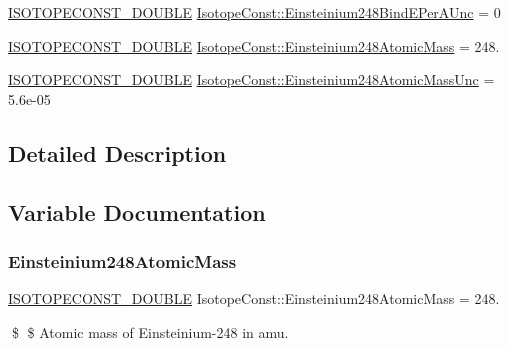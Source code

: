 \begin{DoxyCompactItemize}
\mbox{\hyperlink{group___isotope_const-_macros_ga8f45a7272ce02c0b4c65c44636ed719a}{I\+S\+O\+T\+O\+P\+E\+C\+O\+N\+S\+T\+\_\+\+D\+O\+U\+B\+LE}} \mbox{\hyperlink{group___isotope_const-_einsteinium-_es248_ga39caf7e4ff579f03495d7c194542b9e2}{Isotope\+Const\+::\+Einsteinium248\+Bind\+E\+Per\+A\+Unc}} = 0
\item 
\mbox{\hyperlink{group___isotope_const-_macros_ga8f45a7272ce02c0b4c65c44636ed719a}{I\+S\+O\+T\+O\+P\+E\+C\+O\+N\+S\+T\+\_\+\+D\+O\+U\+B\+LE}} \mbox{\hyperlink{group___isotope_const-_einsteinium-_es248_ga91ebf328b4e4c9b4a2c10d126f9ab33e}{Isotope\+Const\+::\+Einsteinium248\+Atomic\+Mass}} = 248.
\item 
\mbox{\hyperlink{group___isotope_const-_macros_ga8f45a7272ce02c0b4c65c44636ed719a}{I\+S\+O\+T\+O\+P\+E\+C\+O\+N\+S\+T\+\_\+\+D\+O\+U\+B\+LE}} \mbox{\hyperlink{group___isotope_const-_einsteinium-_es248_ga42a211651e7312ba91072dd12fe2cfba}{Isotope\+Const\+::\+Einsteinium248\+Atomic\+Mass\+Unc}} = 5.\+6e-\/05
\end{DoxyCompactItemize}


\subsection{Detailed Description}


\subsection{Variable Documentation}
\mbox{\label{group___isotope_const-_einsteinium-_es248_ga91ebf328b4e4c9b4a2c10d126f9ab33e}} 
\subsubsection{\texorpdfstring{Einsteinium248\+Atomic\+Mass}{Einsteinium248AtomicMass}}
{\footnotesize\ttfamily \mbox{\hyperlink{group___isotope_const-_macros_ga8f45a7272ce02c0b4c65c44636ed719a}{I\+S\+O\+T\+O\+P\+E\+C\+O\+N\+S\+T\+\_\+\+D\+O\+U\+B\+LE}} Isotope\+Const\+::\+Einsteinium248\+Atomic\+Mass = 248.}

\$ \$ Atomic mass of Einsteinium-\/248 in amu. \mbox{\label{group___isotope_const-_einsteinium-_es248_ga42a211651e7312ba91072dd12fe2cfba}} 

